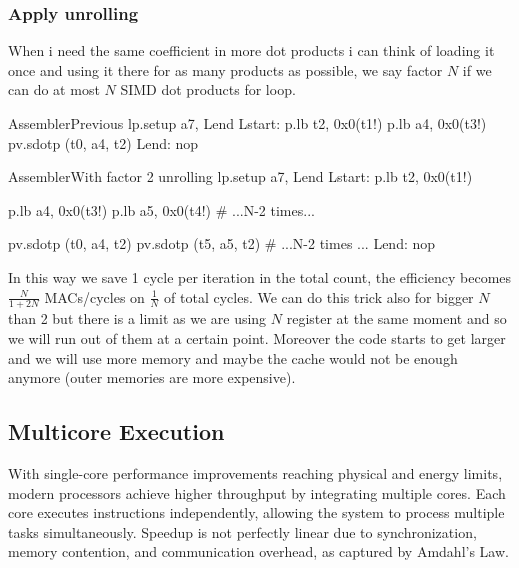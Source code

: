 \subsubsection{Apply unrolling}
When i need the same coefficient in more dot products i can think of loading it once and using it there for as many products as possible, we say factor $N$ if we can do at most $N$ SIMD dot products for loop.
\begin{center}
\begin{minipage}[t]{0.45\textwidth}
\begin{MyCode}{Assembler}{Previous}
lp.setup a7, Lend
Lstart:
    p.lb t2, 0x0(t1!)
    p.lb a4, 0x0(t3!)
    pv.sdotp (t0, a4, t2)
Lend: nop
\end{MyCode}
\end{minipage}
\hfill
\begin{minipage}[t]{0.45\textwidth}
\begin{MyCode}{Assembler}{With factor 2 unrolling}
lp.setup a7, Lend
Lstart:
    p.lb t2, 0x0(t1!)
    
    p.lb a4, 0x0(t3!)
    p.lb a5, 0x0(t4!)
    # ...N-2 times...
    
    pv.sdotp (t0, a4, t2)
    pv.sdotp (t5, a5, t2)
    # ...N-2 times ...
Lend: nop
\end{MyCode}
\end{minipage}
\end{center}

In this way we save 1 cycle per iteration in the total count, the efficiency becomes $\frac{N}{1+2N}$ MACs/cycles on $\frac{1}{N}$ of total cycles. We can do this trick also for bigger $N$ than 2 but there is a limit as we are using $N$ register at the same moment and so we will run out of them at a certain point. Moreover the code starts to get larger and we will use more memory and maybe the cache would not be enough anymore (outer memories are more expensive).

\subsection{Multicore Execution}

With single-core performance improvements reaching physical and energy limits, modern processors achieve higher throughput by integrating multiple cores. Each core executes instructions independently, allowing the system to process multiple tasks simultaneously. Speedup is not perfectly linear due to synchronization, memory contention, and communication overhead, as captured by Amdahl’s Law.  

